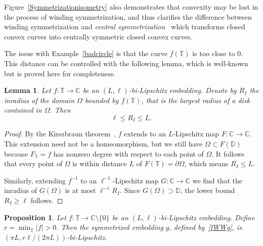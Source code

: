 \documentclass[11pt]{amsart}
\newtheorem{lemma}[theorem]{Lemma}
\newtheorem{proposition}[theorem]{Proposition}
\theoremstyle{remark}
\numberwithin{equation}{section}
\newcommand{\C}{\mathbb{C}}
\newcommand{\DD}{\mathbb{D}}
\newcommand{\T}{\mathbb{T}}
\begin{document}
Figure~\ref{Symmetrizationisometry} also demonstrates that convexity may be lost in the process of winding symmetrization, and thus clarifies the difference between winding symmetrization  and \textit{central symmetrization}~\cite[p.~101]{Egg} which transforms closed convex curves into centrally symmetric closed convex curves. 

The issue with Example~\ref{badcircle} is that the curve $f(\T)$ is too close to $0$. This distance can be controlled with the following lemma, which is well-known but is proved here for completeness. 

\begin{lemma}\label{inradius} Let $f\colon \T\to\C$ be an $(L,\ell)$-bi-Lipschitz embedding. Denote by $R_I$ the inradius of the domain $\Omega$ bounded by $f(\T)$, that is the largest radius of a disk contained in $\Omega$. Then 
\begin{equation}\label{inradius1}
\ell\le R_I \le L.
\end{equation}
\end{lemma}
\begin{proof} By the Kirszbraun theorem~\cite[Theorem 1.34]{BB}, $f$ extends to an $L$-Lipschitz map $F\colon \C\to \C$. This extension need not be a homeomorphism, but we still have $\Omega\subset F(\DD)$ because $F_{\T} = f$ has nonzero degree with respect to each point of $\Omega$. It follows that every point of $\Omega$ is within distance $L$ of $F(\T) = \partial\Omega$, which means $R_I\le L$.  

Similarly, extending $f^{-1}$ to an $\ell^{-1}$-Lipschitz map $G\colon\C\to\C$ we find that the inradius of $G(\Omega)$ is at most $\ell^{-1}R_I$. Since $G(\Omega)\supset \DD$, the lower bound $R_I\ge \ell$ follows.
\end{proof}
 
\begin{proposition}\label{inradbound} Let $f\colon \T\to\C\setminus\{0\}$ be an $(L,\ell)$-bi-Lipschitz embedding. Define $r = \min_{\T}|f| > 0$. Then the symmetrized embedding $g$, defined by~\eqref{fWWg}, is $(\pi L, r\ell/(2\pi L))$-bi-Lipschitz. 
\end{proposition}
\end{document}
